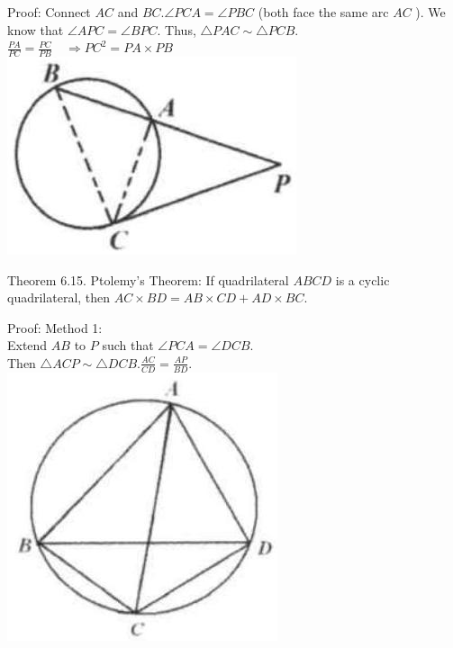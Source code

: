 \documentclass{article}
\begin{document}
Proof:
Connect \(A C\) and \(B C . \angle P C A=\angle P B C\) (both face the same arc \(A C\) ). We know that \(\angle A P C=\angle B P C\). Thus, \(\triangle P A C \sim \triangle P C B\).\\
\(\frac{P A}{P C}=\frac{P C}{P B} \quad \Rightarrow P C^{2}=P A \times P B\)\\
\centering
\includegraphics[width=\textwidth]{images/193.jpg}

Theorem 6.15. Ptolemy's Theorem: If quadrilateral \(A B C D\) is a cyclic quadrilateral, then \(A C \times B D=A B \times C D+A D \times B C\).

Proof:
Method 1:\\
Extend \(A B\) to \(P\) such that \(\angle P C A=\angle D C B\).\\
Then \(\triangle A C P \sim \triangle D C B . \frac{A C}{C D}=\frac{A P}{B D}\).\\
\centering
\includegraphics[width=\textwidth]{images/193(2).jpg}
\end{document}
